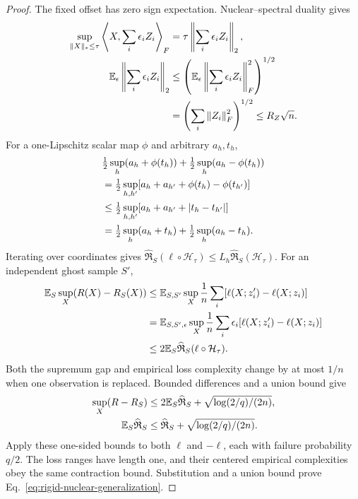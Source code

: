 \begin{proof}
The fixed offset has zero sign expectation. Nuclear--spectral duality gives
\begin{align}
\sup_{\|X\|_*\leq\tau}\left\langle X,\sum_i\epsilon_iZ_i\right\rangle_F
&=\tau\left\|\sum_i\epsilon_iZ_i\right\|_2,\\
\mathbb E_\epsilon\left\|\sum_i\epsilon_iZ_i\right\|_2
&\leq
\left(\mathbb E_\epsilon\left\|\sum_i\epsilon_iZ_i\right\|_F^2\right)^{1/2}\\
&=\left(\sum_i\left\lVert Z_i\right\rVert_F^2\right)^{1/2}\leq R_Z\sqrt n .
\end{align}
For a one-Lipschitz scalar map $\phi$ and arbitrary $a_h,t_h$,
\begin{align}
&\tfrac12\sup_h(a_h+\phi(t_h))
+\tfrac12\sup_h(a_h-\phi(t_h))\notag\\
&=\tfrac12\sup_{h,h'}[a_h+a_{h'}+\phi(t_h)-\phi(t_{h'})]\\
&\leq\tfrac12\sup_{h,h'}[a_h+a_{h'}+|t_h-t_{h'}|]\\
&=\tfrac12\sup_h(a_h+t_h)+\tfrac12\sup_h(a_h-t_h).
\end{align}
Iterating over coordinates gives
$\widehat{\mathfrak R}_S(\ell\circ\mathcal H_\tau)
\leq L_h\widehat{\mathfrak R}_S(\mathcal H_\tau)$.
For an independent ghost sample $S'$,
\begin{align}
\mathbb E_S\sup_X(R(X)-R_S(X))
&\leq\mathbb E_{S,S'}\sup_X\frac1n
\sum_i[\ell(X;z_i')-\ell(X;z_i)]\\
&=\mathbb E_{S,S',\epsilon}\sup_X\frac1n
\sum_i\epsilon_i[\ell(X;z_i')-\ell(X;z_i)]\\
&\leq2\mathbb E_S\widehat{\mathfrak R}_S(\ell\circ\mathcal H_\tau).
\end{align}
Both the supremum gap and empirical loss complexity change by at most
$1/n$ when one observation is replaced. Bounded differences and a union
bound give
\begin{align}
\sup_X(R-R_S)
&\leq2\mathbb E_S\widehat{\mathfrak R}_S
+\sqrt{\log(2/q)/(2n)},\\
\mathbb E_S\widehat{\mathfrak R}_S
&\leq\widehat{\mathfrak R}_S+\sqrt{\log(2/q)/(2n)}.
\end{align}
Apply these one-sided bounds to both $\ell$ and $-\ell$, each with
failure probability $q/2$. The loss ranges have length one, and their
centered empirical complexities obey the same contraction bound.
Substitution and a union bound prove
Eq.~\eqref{eq:rigid-nuclear-generalization}.
\end{proof}

